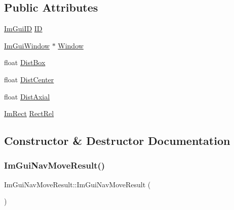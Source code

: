 \subsection*{Public Attributes}
\begin{DoxyCompactItemize}
\item 
\mbox{\hyperlink{imgui_8h_a1785c9b6f4e16406764a85f32582236f}{Im\+Gui\+ID}} \mbox{\hyperlink{struct_im_gui_nav_move_result_a1f74aade31c404a897cf20f538861fb0}{ID}}
\item 
\mbox{\hyperlink{struct_im_gui_window}{Im\+Gui\+Window}} $\ast$ \mbox{\hyperlink{struct_im_gui_nav_move_result_a23b95c81d85a99990560c4072a135eb6}{Window}}
\item 
float \mbox{\hyperlink{struct_im_gui_nav_move_result_a2f354f281a4bd3dcb67f62ca945a11a3}{Dist\+Box}}
\item 
float \mbox{\hyperlink{struct_im_gui_nav_move_result_abba7cd20008c9a6ad40a2c058d4fdb92}{Dist\+Center}}
\item 
float \mbox{\hyperlink{struct_im_gui_nav_move_result_ae5c10e5023d0a29fb7d5cbfa67cf20e5}{Dist\+Axial}}
\item 
\mbox{\hyperlink{struct_im_rect}{Im\+Rect}} \mbox{\hyperlink{struct_im_gui_nav_move_result_ae1be85fdcad1fc7c2bfa367862da2ccf}{Rect\+Rel}}
\end{DoxyCompactItemize}


\subsection{Constructor \& Destructor Documentation}
\mbox{\label{struct_im_gui_nav_move_result_a76bcc6d5bb813a8b9787bec50426cda2}} 
\subsubsection{\texorpdfstring{Im\+Gui\+Nav\+Move\+Result()}{ImGuiNavMoveResult()}}
{\footnotesize\ttfamily Im\+Gui\+Nav\+Move\+Result\+::\+Im\+Gui\+Nav\+Move\+Result (\begin{DoxyParamCaption}{ }\end{DoxyParamCaption})\hspace{0.3cm}{\ttfamily [inline]}}

